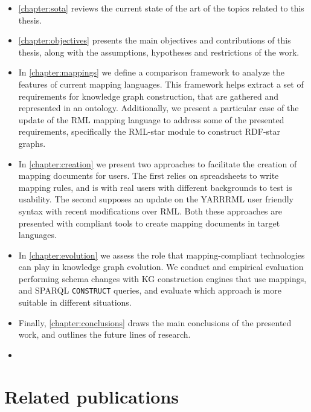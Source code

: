 \begin{itemize}
    \item \cref{chapter:sota} reviews the current state of the art of the topics related to this thesis. 
    
    \item \cref{chapter:objectives} presents the main objectives and contributions of this thesis, along with the assumptions, hypotheses and restrictions of the work. 
    
    \item In \cref{chapter:mappings} we define a comparison framework to analyze the features of current mapping languages. This framework helps extract a set of requirements for knowledge graph construction, that are gathered and represented in an ontology. Additionally, we present a particular case of the update of the RML mapping language to address some of the presented requirements, specifically the RML-star module to construct RDF-star graphs.
    
    \item In \cref{chapter:creation} we present two approaches to facilitate the creation of mapping documents for users. The first relies on spreadsheets to write mapping rules, and is with real users with different backgrounds to test is usability. The second supposes an update on the YARRRML user friendly syntax with recent modifications over RML. Both these approaches are presented with compliant tools to create mapping documents in target languages. 
    
    \item In \cref{chapter:evolution} we assess the role that mapping-compliant technologies can play in knowledge graph evolution. We conduct and empirical evaluation performing schema changes with KG construction engines that use mappings, and SPARQL \texttt{CONSTRUCT} queries, and evaluate which approach is more suitable in different situations. 
    
    \item Finally, \cref{chapter:conclusions} draws the main conclusions of the presented work, and outlines the future lines of research. 
    
    \item {}
\end{itemize}


\section{Related publications}

